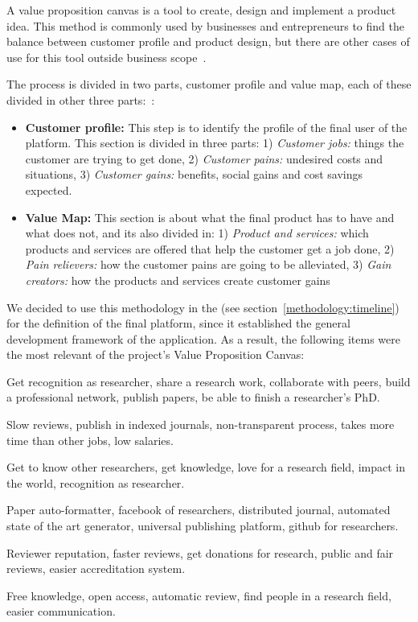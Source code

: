 
A value proposition canvas is a tool to create, design and implement a product
idea. This method is commonly used by businesses and entrepreneurs to find the
balance between customer profile and product design, but there are other cases
of use for this tool outside business
scope~\cite{pokorna2015value,meertens2012mapping}.

The process is divided in two parts, customer profile and value map, each of
these divided in other three parts:~\cite{osterwalder2014value}:

\begin{itemize}
\item \textbf{Customer profile:} This step is to identify the profile of the
  final user of the platform. This section is divided in three parts: 1)
  \emph{Customer jobs:} things the customer are trying to get done, 2)
  \emph{Customer pains:} undesired costs and situations, 3) \emph{Customer
    gains:} benefits, social gains and cost savings expected.
\item \textbf{Value Map:} This section is about what the final product has to
  have and what does not, and its also divided in: 1) \emph{Product and
    services:} which products and services are offered that help the customer
  get a job done, 2) \emph{Pain relievers:} how the customer pains are going to
  be alleviated, 3) \emph{Gain creators:} how the products and services create
  customer gains
\end{itemize}

We decided to use this methodology in the (see
section~\ref{methodology:timeline}) for the definition of the final platform,
since it established the general development framework of the application. As a
result, the following items were the most relevant of the project's Value
Proposition Canvas:

\begin{itemize}
   Get recognition as researcher, share a research work,
  collaborate with peers, build a professional network, publish papers, be able
  to finish a researcher's PhD.

   Slow reviews, publish in indexed journals,
  non-transparent process, takes more time than other jobs, low salaries.

   Get to know other researchers, get knowledge, love for
  a research field, impact in the world, recognition as researcher.

   Paper auto-formatter, facebook of researchers,
  distributed journal, automated state of the art generator, universal
  publishing platform, github for researchers.

   Reviewer reputation, faster reviews, get donations for
  research, public and fair reviews, easier accreditation system.

   Free knowledge, open access, automatic review, find
  people in a research field, easier communication.
\end{itemize}

